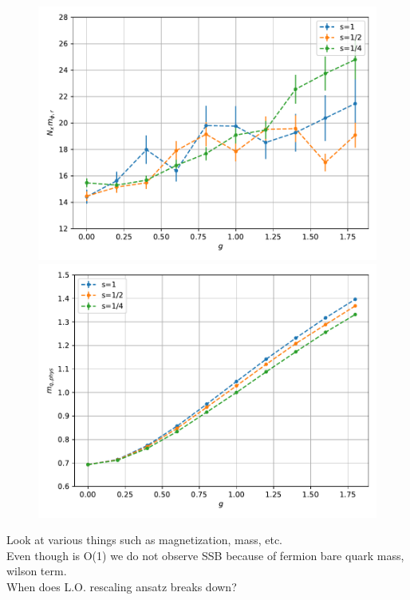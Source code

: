 \begin{figure}
\begin{minipage}{0.45\textwidth}
        \includegraphics[scale=0.45]{figures/rescaling/mphir.pdf}
    \end{minipage}
    \hfill 
    \begin{minipage}{0.45\textwidth}
        \includegraphics[scale=0.45]{figures/rescaling/mqphys.pdf}
    \end{minipage}
    \label{fig:cooling}
\end{figure}


Look at various things such as magnetization, mass, etc. \\
Even though is O(1) we do not observe SSB because of fermion bare quark mass, wilson term. \\
When does L.O. rescaling ansatz breaks down?



